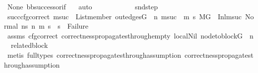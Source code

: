 \begin{isabellebody}
\ None\ bb{\isacharunderscore}{\kern0pt}successor{\isacharunderscore}{\kern0pt}if\ {}\ \isamarkupfalse%
\ auto\isanewline
\isanewline
\ \ \ \ \ \ \ \ \ \ \isamarkupfalse%
\ snd{\isacharunderscore}{\kern0pt}step\ \isanewline
\ \ \ \ \ \ \ \ \ \ \isamarkupfalse%
\ succ{\isacharunderscore}{\kern0pt}cfg{\isacharunderscore}{\kern0pt}correct{\isacharcolon}{\kern0pt}\ {\isachardoublequoteopen}{\isacharparenleft}{\kern0pt}{\isasymforall}msuc{}{\isachardot}{\kern0pt}\ \ List{\isachardot}{\kern0pt}member\ {\isacharparenleft}{\kern0pt}out{\isacharunderscore}{\kern0pt}edges{\isacharparenleft}{\kern0pt}G{\isacharparenright}{\kern0pt}\ {\isacharbang}{\kern0pt}\ n{\isacharparenright}{\kern0pt}\ msuc{}\ {\isasymlongrightarrow}\ {\isacharparenleft}{\kern0pt}{\isasymforall}m{}\ s{}{\isachardot}{\kern0pt}\ {\isacharparenleft}{\kern0pt}{\isacharparenleft}{\kern0pt}M{\isacharcomma}{\kern0pt}{\isasymLambda}{\isacharcomma}{\kern0pt}{\isasymGamma}{\isacharcomma}{\kern0pt}{\isasymOmega}{\isacharcomma}{\kern0pt}G\ {\isasymturnstile}\ {\isacharparenleft}{\kern0pt}Inl{\isacharparenleft}{\kern0pt}msuc{}{\isacharparenright}{\kern0pt}{\isacharcomma}{\kern0pt}\ {\isacharparenleft}{\kern0pt}Normal\ ns{}{\isacharparenright}{\kern0pt}{\isacharparenright}{\kern0pt}\ {\isacharminus}{\kern0pt}n{\isasymrightarrow}{\isacharasterisk}{\kern0pt}\ {\isacharparenleft}{\kern0pt}m{}{\isacharcomma}{\kern0pt}\ s{}{\isacharparenright}{\kern0pt}{\isacharparenright}{\kern0pt}\ {\isasymlongrightarrow}\ s{}\ {\isasymnoteq}\ Failure{\isacharparenright}{\kern0pt}{\isacharparenright}{\kern0pt}{\isacharparenright}{\kern0pt}{\isachardoublequoteclose}\isanewline
\ \ \ \ \ \ \ \ \ \ \ \ \isamarkupfalse%
\ assms{\isacharparenleft}{\kern0pt}{}{\isacharparenright}{\kern0pt}\ cfg{\isacharunderscore}{\kern0pt}correct\ correctness{\isacharunderscore}{\kern0pt}propagates{\isacharunderscore}{\kern0pt}through{\isacharunderscore}{\kern0pt}empty\ local{\isachardot}{\kern0pt}Nil\ {\isacartoucheopen}node{\isacharunderscore}{\kern0pt}to{\isacharunderscore}{\kern0pt}block{\isacharparenleft}{\kern0pt}G{\isacharparenright}{\kern0pt}\ {\isacharbang}{\kern0pt}\ n\ {\isacharequal}{\kern0pt}\ related{\isacharunderscore}{\kern0pt}block{\isacartoucheclose}\isanewline
\ \ \ \ \ \ \ \ \ \ \ \ \isamarkupfalse%
\ {\isacharparenleft}{\kern0pt}metis\ {\isacharparenleft}{\kern0pt}full{\isacharunderscore}{\kern0pt}types{\isacharparenright}{\kern0pt}\ correctness{\isacharunderscore}{\kern0pt}propagates{\isacharunderscore}{\kern0pt}through{\isacharunderscore}{\kern0pt}assumption\ correctness{\isacharunderscore}{\kern0pt}propagates{\isacharunderscore}{\kern0pt}through{\isacharunderscore}{\kern0pt}assumption{}{\isacharparenright}{\kern0pt}\isanewline

\end{isabellebody}
